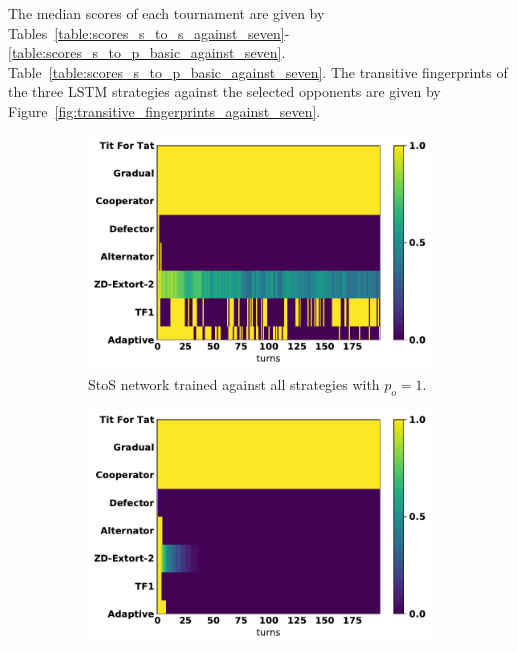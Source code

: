 The median scores of each tournament are given by
Tables~\ref{table:scores_s_to_s_against_seven}-
\ref{table:scores_s_to_p_basic_against_seven}.
Table~\ref{table:scores_s_to_p_basic_against_seven}. The transitive fingerprints
of the three LSTM strategies against the selected opponents are given by
Figure~\ref{fig:transitive_fingerprints_against_seven}.

\begin{figure}[!htbp]
    \begin{subfigure}{.32\textwidth}
        \includegraphics[width=\textwidth]{src/chapters/07/img/s_t_s_against_seven_opponents.pdf}
        \caption{StoS network trained
        against all strategies with $p_o=1$.}
    \end{subfigure}\hfill
\begin{subfigure}{.32\textwidth}
        \includegraphics[width=\textwidth]{src/chapters/07/img/s_t_p_twenty_against_seven_opponents.pdf}

\end{subfigure}
\end{figure}
